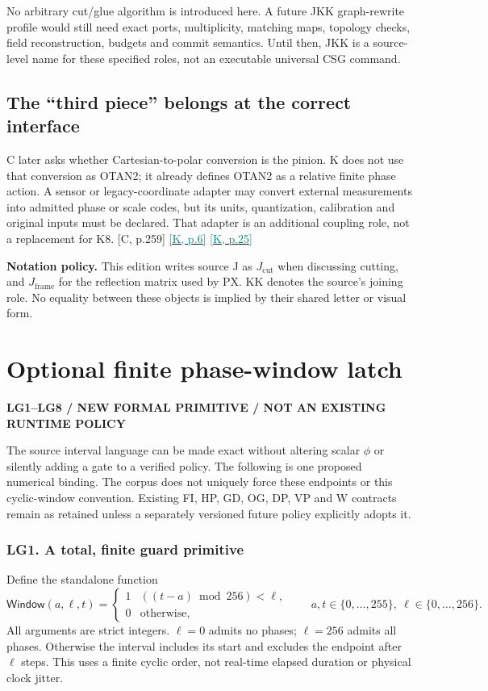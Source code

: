 \documentclass[11pt,a4paper]{article}
\newcommand{\kref}[1]{\hyperlink{baseline.#1}{\textcolor{teal}{[K, p.#1]}}}
\newcommand{\crefpage}[1]{\textcolor{muted}{[C, p.#1]}}
\newcommand{\status}[1]{{\sffamily\bfseries\scriptsize\color{teal}#1}\par}
\newcommand{\req}[2]{\subsubsection{#1. #2}}
\newcommand{\sectionstart}[1]{\par\addvspace{18pt}\Needspace{12\baselineskip}\section{#1}}
\theoremstyle{lpstyle}
\begin{document}
No arbitrary cut/glue algorithm is introduced here. A future JKK graph-rewrite profile would still need exact ports, multiplicity, matching maps, topology checks, field reconstruction, budgets and commit semantics. Until then, JKK is a source-level name for these specified roles, not an executable universal CSG command.

\subsection{The ``third piece'' belongs at the correct interface}
C later asks whether Cartesian-to-polar conversion is the pinion. K does not use that conversion as OTAN2; it already defines OTAN2 as a relative finite phase action. A sensor or legacy-coordinate adapter may convert external measurements into admitted phase or scale codes, but its units, quantization, calibration and original inputs must be declared. That adapter is an additional coupling role, not a replacement for K8. \crefpage{259} \kref{6} \kref{25}

\begin{scopebox}
\textbf{Notation policy.} This edition writes source J as $J_{\mathrm{cut}}$ when discussing cutting, and $J_{\mathrm{frame}}$ for the reflection matrix used by PX. KK denotes the source's joining role. No equality between these objects is implied by their shared letter or visual form.
\end{scopebox}

\sectionstart{Optional finite phase-window latch}
\status{LG1--LG8 / NEW FORMAL PRIMITIVE / NOT AN EXISTING RUNTIME POLICY}
The source interval language can be made exact without altering scalar $\phi$ or silently adding a gate to a verified policy. The following is one proposed numerical binding. The corpus does not uniquely force these endpoints or this cyclic-window convention. Existing FI, HP, GD, OG, DP, VP and W contracts remain as retained unless a separately versioned future policy explicitly adopts it.

\req{LG1}{A total, finite guard primitive}
Define the standalone function
\[
\mathsf{Window}(a,\ell,t)=
\begin{cases}
1 & ((t-a)\bmod256)<\ell,\\
0 & \text{otherwise},
\end{cases}
\qquad a,t\in\{0,\ldots,255\},\ \ell\in\{0,\ldots,256\}.
\]
All arguments are strict integers. $\ell=0$ admits no phases; $\ell=256$ admits all phases. Otherwise the interval includes its start and excludes the endpoint after $\ell$ steps. This uses a finite cyclic order, not real-time elapsed duration or physical clock jitter.
\end{document}
